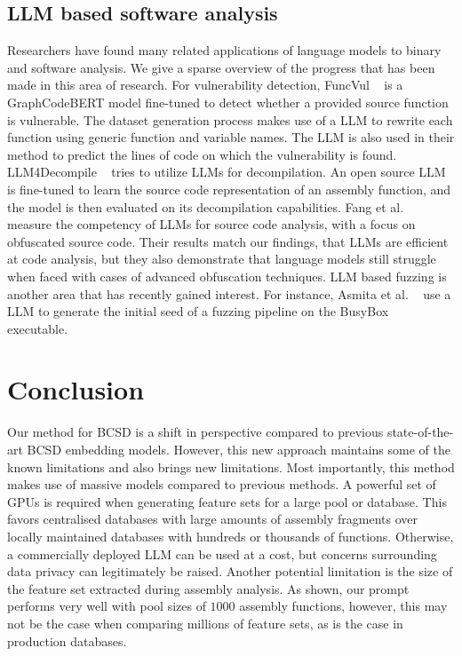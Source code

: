 \subsection{LLM based software analysis}

Researchers have found many related applications of language models to binary and software analysis.
We give a sparse overview of the progress that has been made in this area of research.
For vulnerability detection, FuncVul ~\cite{funcVul} is a GraphCodeBERT model fine-tuned to detect whether a provided
source function is vulnerable. The dataset generation process makes use of a LLM to rewrite each function
using generic function and variable names. The LLM is also used in their method to predict the lines of code on which the vulnerability is found.
LLM4Decompile ~\cite{llm4decompile} tries to utilize LLMs for decompilation. An open source LLM is fine-tuned to learn the source code
representation of an assembly function, and the model is then evaluated on its decompilation capabilities. Fang et al. ~\cite{source-analysis}
measure the competency of LLMs for source code analysis, with a focus on obfuscated source code.
Their results match our findings, that LLMs are efficient at code analysis, but they
also demonstrate that language models still struggle when faced with cases of advanced obfuscation techniques.
LLM based fuzzing is another area that has recently gained interest. For instance, Asmita et al. ~\cite{llm-fuzz} use a LLM to
generate the initial seed of a fuzzing pipeline on the BusyBox ~\cite{busybox} executable.

\section{Conclusion}

Our method for BCSD is a shift in perspective compared to previous state-of-the-art BCSD embedding models. However,
this new approach maintains some of the known limitations and also brings new limitations. Most importantly, this
method makes use of massive models compared to previous methods. A powerful set of GPUs is required when generating
feature sets for a large pool or database. This favors centralised databases with large amounts of assembly fragments over
locally maintained databases with hundreds or thousands of functions. Otherwise, a commercially deployed LLM can be used at a
cost, but concerns surrounding data privacy can legitimately be raised. Another potential limitation is the size of the feature
set extracted during assembly analysis. As shown, our prompt performs very well with pool sizes of \(1000\) assembly functions,
however, this may not be the case when comparing millions of feature sets, as is the case in production databases.

